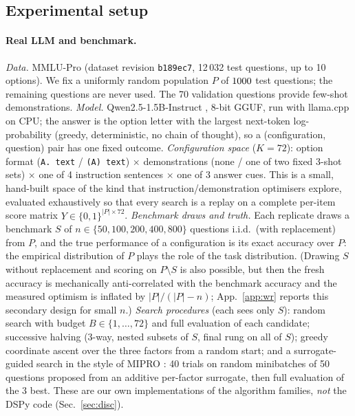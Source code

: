 \subsection{Experimental setup}
\paragraph{Real LLM and benchmark.}
\emph{Data.} MMLU-Pro \citep{wang2024mmlupro} (dataset revision \texttt{b189ec7}, 12\,032 test questions, up to 10 options). We fix a uniformly random population $P$ of $1000$ test questions; the remaining questions are never used. The 70 validation questions provide few-shot demonstrations.
\emph{Model.} Qwen2.5-1.5B-Instruct \citep{qwen2024qwen25}, 8-bit GGUF, run with llama.cpp on CPU; the answer is the option letter with the largest next-token log-probability (greedy, deterministic, no chain of thought), so a (configuration, question) pair has one fixed outcome.
\emph{Configuration space} ($K{=}72$): option format (\texttt{A.\ text} / \texttt{(A) text}) $\times$ demonstrations (none / one of two fixed 3-shot sets) $\times$ one of 4 instruction sentences $\times$ one of 3 answer cues. This is a small, hand-built space of the kind that instruction/demonstration optimisers explore, evaluated exhaustively so that every search is a replay on a complete per-item score matrix $Y\in\{0,1\}^{|P|\times 72}$.
\emph{Benchmark draws and truth.} Each replicate draws a benchmark $S$ of $n\in\{50,100,200,400,800\}$ questions i.i.d.\ (with replacement) from $P$, and the true performance of a configuration is its exact accuracy over $P$: the empirical distribution of $P$ plays the role of the task distribution. (Drawing $S$ without replacement and scoring on $P\setminus S$ is also possible, but then the fresh accuracy is mechanically anti-correlated with the benchmark accuracy and the measured optimism is inflated by $|P|/(|P|-n)$; App.~\ref{app:wr} reports this secondary design for small $n$.) \emph{Search procedures} (each sees only $S$): random search with budget $B\in\{1,\dots,72\}$ and full evaluation of each candidate; successive halving (3-way, nested subsets of $S$, final rung on all of $S$); greedy coordinate ascent over the three factors from a random start; and a surrogate-guided search in the style of MIPRO \citep{opsahl2024optimizing}: 40 trials on random minibatches of 50 questions proposed from an additive per-factor surrogate, then full evaluation of the 3 best. These are our own implementations of the algorithm families, \emph{not} the DSPy code (Sec.~\ref{sec:disc}).


